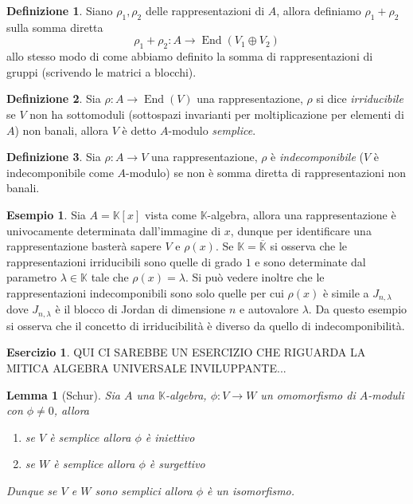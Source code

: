 \documentclass[11pt]{article}
\theoremstyle{plain}
\newtheorem{lemma}[thm]{Lemma}
\theoremstyle{definition}
\newtheorem{defn}{Definizione}[section]
\newtheorem{exmp}{Esempio}[section]
\newtheorem{exercise}{Esercizio}[section]
\theoremstyle{remark}
\newcommand{\K}{\mathbb{K}}
\DeclareMathOperator{\End}{End}
\begin{document}
	\begin{defn}
		Siano $\rho_1, \rho_2$ delle rappresentazioni di $A$, allora definiamo $\rho_1+\rho_2$ sulla somma diretta
		\[
			\rho_1+\rho_2:A\to \End(V_1\oplus V_2)
		\]
		allo stesso modo di come abbiamo definito la somma di rappresentazioni di gruppi (scrivendo le matrici a blocchi).
	\end{defn}

	\begin{defn}
		Sia $\rho:A\to \End(V)$ una rappresentazione, $\rho$ si dice \textit{irriducibile} se $V$ non ha sottomoduli (sottospazi invarianti per moltiplicazione per elementi di $A$) non banali, allora $V$ è detto $A$-modulo \textit{semplice}.
	\end{defn}
	\begin{defn}
		Sia $\rho:A\to V$ una rappresentazione, $\rho$ è \textit{indecomponibile} ($V$ è indecomponibile come $A$-modulo) se non è somma diretta di rappresentazioni non banali.
	\end{defn}
	\begin{exmp}
		Sia $A=\K[x]$ vista come $\K$-algebra, allora una rappresentazione è univocamente determinata dall'immagine di $x$, dunque per identificare una rappresentazione basterà sapere $V$ e $\rho(x)$. Se $\K = \overline{\K}$ si osserva che le rappresentazioni irriducibili sono quelle di grado $1$ e sono determinate dal parametro $\lambda\in \K$ tale che $\rho(x)=\lambda$. Si può vedere inoltre che le rappresentazioni indecomponibili sono solo quelle per cui $\rho(x)$ è simile a $J_{n,\lambda}$ dove $J_{n,\lambda}$ è il blocco di Jordan di dimensione $n$ e autovalore $\lambda$.\newline
		Da questo esempio si osserva che il concetto di irriducibilità è diverso da quello di indecomponibilità.
	\end{exmp}
	\begin{exercise}
		QUI CI SAREBBE UN ESERCIZIO CHE RIGUARDA LA MITICA ALGEBRA UNIVERSALE INVILUPPANTE...
	\end{exercise}
	\begin{lemma}[Schur]
		Sia $A$ una $\K$-algebra, $\phi:V\to W$ un omomorfismo di $A$-moduli con $\phi \neq 0$, allora
		\begin{enumerate}
			\item se $V$ è semplice allora $\phi$ è iniettivo
			\item se $W$ è semplice allora $\phi$ è surgettivo
		\end{enumerate}
		Dunque se $V$ e $W$ sono semplici allora $\phi$ è un isomorfismo.
	\end{lemma}
\end{document}

